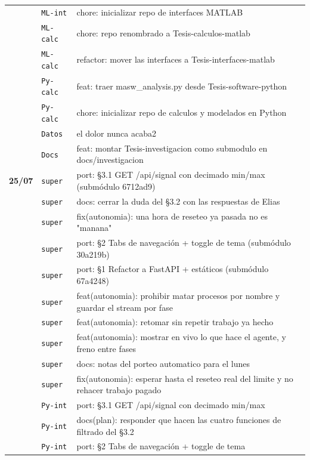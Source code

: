 \begin{longtable}{@{}p{1.7cm} p{1.5cm} p{12.2cm}@{}}
 & \texttt{\scriptsize ML-int} & chore: inicializar repo de interfaces MATLAB \\
 & \texttt{\scriptsize ML-calc} & chore: repo renombrado a Tesis-calculos-matlab \\
 & \texttt{\scriptsize ML-calc} & refactor: mover las interfaces a Tesis-interfaces-matlab \\
 & \texttt{\scriptsize Py-calc} & feat: traer masw\_analysis.py desde Tesis-software-python \\
 & \texttt{\scriptsize Py-calc} & chore: inicializar repo de calculos y modelados en Python \\
 & \texttt{\scriptsize Datos} & el dolor nunca acaba2 \\
 & \texttt{\scriptsize Docs} & feat: montar Tesis-investigacion como submodulo en docs/investigacion \\
\textbf{25/07} & \texttt{\scriptsize super} & port: §3.1 GET /api/signal con decimado min/max (submódulo 6712ad9) \\
 & \texttt{\scriptsize super} & docs: cerrar la duda del §3.2 con las respuestas de Elias \\
 & \texttt{\scriptsize super} & fix(autonomia): una hora de reseteo ya pasada no es "manana" \\
 & \texttt{\scriptsize super} & port: §2 Tabs de navegación + toggle de tema (submódulo 30a219b) \\
 & \texttt{\scriptsize super} & port: §1 Refactor a FastAPI + estáticos (submódulo 67a4248) \\
 & \texttt{\scriptsize super} & feat(autonomia): prohibir matar procesos por nombre y guardar el stream por fase \\
 & \texttt{\scriptsize super} & feat(autonomia): retomar sin repetir trabajo ya hecho \\
 & \texttt{\scriptsize super} & feat(autonomia): mostrar en vivo lo que hace el agente, y freno entre fases \\
 & \texttt{\scriptsize super} & docs: notas del porteo automatico para el lunes \\
 & \texttt{\scriptsize super} & fix(autonomia): esperar hasta el reseteo real del limite y no rehacer trabajo pagado \\
 & \texttt{\scriptsize Py-int} & port: §3.1 GET /api/signal con decimado min/max \\
 & \texttt{\scriptsize Py-int} & docs(plan): responder que hacen las cuatro funciones de filtrado del §3.2 \\
 & \texttt{\scriptsize Py-int} & port: §2 Tabs de navegación + toggle de tema \\

\end{longtable}

